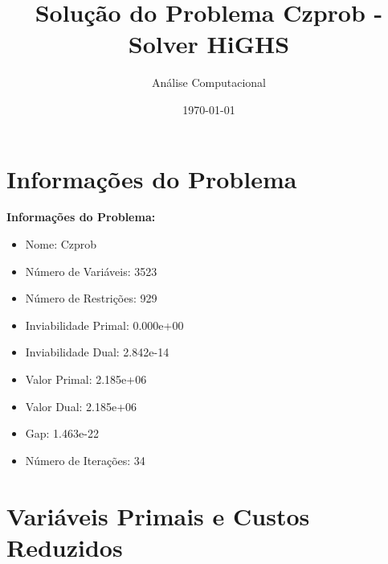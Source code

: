 \documentclass[12pt]{article}
\title{Solução do Problema Czprob - Solver HiGHS}
\author{Análise Computacional}
\date{\today}
\begin{document}
\maketitle

\section{Informações do Problema}

\textbf{Informações do Problema:}
\begin{itemize}
\item Nome: Czprob
\item Número de Variáveis: 3523
\item Número de Restrições: 929
\item Inviabilidade Primal: 0.000e+00
\item Inviabilidade Dual: 2.842e-14
\item Valor Primal: 2.185e+06
\item Valor Dual: 2.185e+06
\item Gap: 1.463e-22
\item Número de Iterações: 34
\end{itemize}


\section{Variáveis Primais e Custos Reduzidos}
\end{document}
